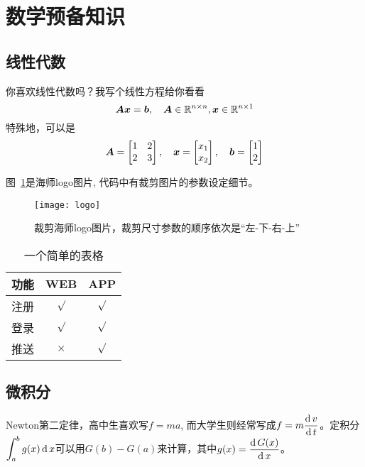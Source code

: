\appendices
\section{数学预备知识}
\subsection{线性代数}
你喜欢线性代数吗？我写个线性方程给你看看
\begin{equation}
	\bm{A} \bm{x}= \bm{b}, \quad \bm{A}\in \mathbb{R}^{{n}\times {n}}, \bm{x}\in \mathbb{R}^{{n}\times {1}}
\end{equation}
特殊地，可以是
\begin{equation}
	\bm{A} = \begin{bmatrix}
		1 & 2 \\
		2 & 3 
	\end{bmatrix},\quad
	\bm{x}=\begin{bmatrix}
		x_1 \\ x_2
	\end{bmatrix}, \quad
	\bm{b} =\begin{bmatrix}
		1 \\ 2
	\end{bmatrix}
\end{equation}

图~\ref{hnulogo}是海师logo图片, 代码中有裁剪图片的参数设定细节。
\begin{figure}[hp]
	\centering
	\texttt{[image: logo]}
	\caption{裁剪海师logo图片，裁剪尺寸参数的顺序依次是“左-下-右-上”}
	\label{hnulogo}
\end{figure}

\begin{table}[htp]
	\caption{一个简单的表格}\label{tab1}
	\centering
	\begin{tabular}{|l|c|c|}
		\hline
		功能          &WEB         &APP         \\ \hline
		注册          &$\surd$     &$\surd$     \\ \hline
		登录          &$\surd$     &$\surd$     \\ \hline
		推送          &$\times$    &$\surd$     \\ \hline
	\end{tabular}
\end{table}

\subsection{微积分}
Newton第二定律，高中生喜欢写$f=ma$, 而大学生则经常写成$\displaystyle{f=m\frac{\operatorname{\mathrm{d}}{v}}{\operatorname{\mathrm{d}}{t}}}$。定积分
$\displaystyle{\int^b_a g(x)\operatorname{\mathrm{d}}x}$可以用$G(b)-G(a)$来计算，其中$\displaystyle g(x) = \frac{\operatorname{\mathrm{d}} {G(x)}}{\operatorname{\mathrm{d}} {x}}$。


